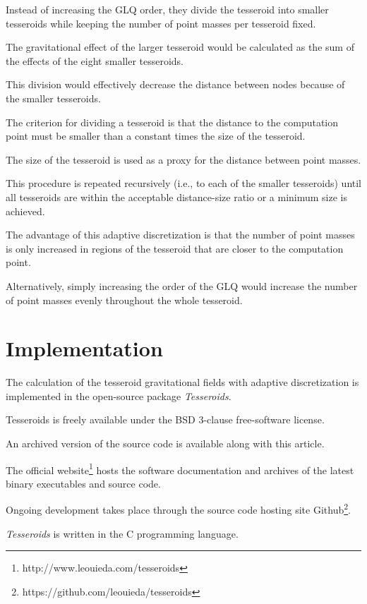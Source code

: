\documentclass[manuscript]{geophysics}
\begin{document}
Instead of increasing the GLQ order,
they divide the tesseroid into smaller tesseroids while keeping the number of
point masses per tesseroid fixed.

The gravitational effect of the larger tesseroid would be calculated as the sum
of the effects of the eight smaller tesseroids.

This division would effectively decrease the distance between nodes because of
the smaller tesseroids.

The criterion for dividing a tesseroid is that
the distance to the computation point must be smaller than
a constant times the size of the tesseroid.

The size of the tesseroid is used as a proxy for the distance between point
masses.

This procedure is repeated recursively
(i.e., to each of the smaller tesseroids)
until all tesseroids are within the acceptable distance-size ratio
or a minimum size is achieved.


The advantage of this adaptive discretization is that the number of point
masses is only increased in regions of the tesseroid that are closer to the
computation point.

Alternatively, simply increasing the order of the GLQ would increase the number
of point masses evenly throughout the whole tesseroid.

\section{Implementation}

The calculation of the tesseroid gravitational fields with adaptive
discretization is implemented in the open-source package \textit{Tesseroids}.

Tesseroids is freely available under the BSD 3-clause free-software license.

An archived version of the source code is available along with this article.

The official website\footnote{http://www.leouieda.com/tesseroids}
hosts the software documentation and
archives of the latest binary executables and source code.

Ongoing development takes place through the source code hosting site
Github\footnote{https://github.com/leouieda/tesseroids}.



\textit{Tesseroids} is written in the C programming language.
\end{document}
